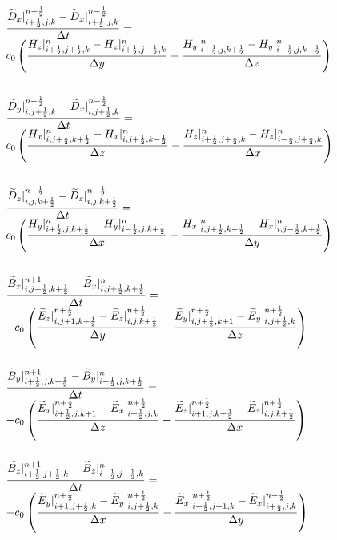 \begin{gather}
  \begin{array}{@{}l@{}}
    \displaystyle \frac{\widetilde{D}_x|_{i+\frac{1}{2},j,k}^{n+\frac{1}{2}} - \widetilde{D}_x|_{i+\frac{1}{2},j,k}^{n-\frac{1}{2}}}{\Delta t} = \\
    \displaystyle c_0\left(\frac{H_z|_{i+\frac{1}{2},j+\frac{1}{2},k}^{n} - H_z|_{i+\frac{1}{2},j-\frac{1}{2},k}^{n}}{\Delta y} - \frac{H_y|_{i+\frac{1}{2},j,k+\frac{1}{2}}^{n} - H_y|_{i+\frac{1}{2},j,k-\frac{1}{2}}^{n}}{\Delta z}\right)\\[3em]
    \displaystyle \frac{\widetilde{D}_y|_{i,j+\frac{1}{2},k}^{n+\frac{1}{2}} - \widetilde{D}_x|_{i,j+\frac{1}{2},k}^{n-\frac{1}{2}}}{\Delta t} = \\
    \displaystyle c_0\left(\frac{H_x|_{i,j+\frac{1}{2},k+\frac{1}{2}}^{n} - H_x|_{i,j+\frac{1}{2},k-\frac{1}{2}}^{n}}{\Delta z} - \frac{H_z|_{i+\frac{1}{2},j+\frac{1}{2},k}^{n} - H_z|_{i-\frac{1}{2},j+\frac{1}{2},k}^{n}}{\Delta x}\right)\\[3em]
    \displaystyle \frac{\widetilde{D}_z|_{i,j,k+\frac{1}{2}}^{n+\frac{1}{2}} - \widetilde{D}_z|_{i,j,k+\frac{1}{2}}^{n-\frac{1}{2}}}{\Delta t} = \\
    \displaystyle c_0\left(\frac{H_y|_{i+\frac{1}{2},j,k+\frac{1}{2}}^{n} - H_y|_{i-\frac{1}{2},j,k+\frac{1}{2}}^{n}}{\Delta x} - \frac{H_x|_{i,j+\frac{1}{2},k+\frac{1}{2}}^{n} - H_x|_{i,j-\frac{1}{2},k+\frac{1}{2}}^{n}}{\Delta y}\right)\\[3em]
    \displaystyle \frac{\widetilde{B}_x|_{i,j+\frac{1}{2},k+\frac{1}{2}}^{n+1} - \widetilde{B}_x|_{i,j+\frac{1}{2},k+\frac{1}{2}}^{n}}{\Delta t} = \\
    \displaystyle - c_0\left(\frac{\widetilde{E}_z|_{i,j+1,k+\frac{1}{2}}^{n+\frac{1}{2}} - \widetilde{E}_z|_{i,j,k+\frac{1}{2}}^{n+\frac{1}{2}}}{\Delta y} - \frac{\widetilde{E}_y|_{i,j+\frac{1}{2},k+1}^{n+\frac{1}{2}} - \widetilde{E}_y|_{i,j+\frac{1}{2},k}^{n+\frac{1}{2}}}{\Delta z}\right)\\[3em]
    \displaystyle \frac{\widetilde{B}_y|_{i+\frac{1}{2},j,k+\frac{1}{2}}^{n+1} - \widetilde{B}_y|_{i+\frac{1}{2},j,k+\frac{1}{2}}^{n}}{\Delta t} = \\
    \displaystyle - c_0\left(\frac{\widetilde{E}_x|_{i+\frac{1}{2},j,k+1}^{n+\frac{1}{2}} - \widetilde{E}_x|_{i+\frac{1}{2},j,k}^{n+\frac{1}{2}}}{\Delta z} - \frac{\widetilde{E}_z|_{i+1,j,k+\frac{1}{2}}^{n+\frac{1}{2}} - \widetilde{E}_z|_{i,j,k+\frac{1}{2}}^{n+\frac{1}{2}}}{\Delta x}\right)\\[3em]
    \displaystyle \frac{\widetilde{B}_z|_{i+\frac{1}{2},j+\frac{1}{2},k}^{n+1} - \widetilde{B}_z|_{i+\frac{1}{2},j+\frac{1}{2},k}^{n}}{\Delta t} = \\
    \displaystyle - c_0\left(\frac{\widetilde{E}_y|_{i+1,j+\frac{1}{2},k}^{n+\frac{1}{2}} - \widetilde{E}_y|_{i,j+\frac{1}{2},k}^{n+\frac{1}{2}}}{\Delta x} - \frac{\widetilde{E}_x|_{i+\frac{1}{2},j+1,k}^{n+\frac{1}{2}} - \widetilde{E}_x|_{i+\frac{1}{2},j,k}^{n+\frac{1}{2}}}{\Delta y}\right)
  \end{array}
\end{gather}
